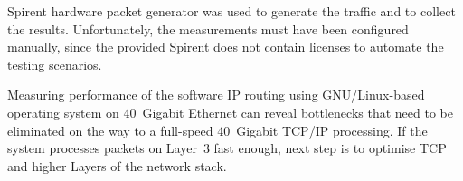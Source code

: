 Spirent hardware packet generator was used to generate the traffic and to collect the results.
Unfortunately, the measurements must have been configured manually, since the provided Spirent does not
contain licenses to automate the testing scenarios.

Measuring performance of the software IP routing using GNU/Linux-based operating system on 40~Gigabit Ethernet
can reveal bottlenecks that need to be eliminated
on the way to a full-speed 40~Gigabit TCP/IP processing.
If the system processes packets on Layer~3 fast enough,
next step is to optimise TCP and higher Layers of the network stack.
